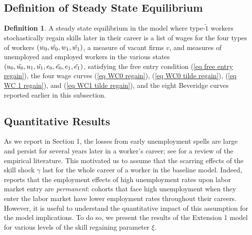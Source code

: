 \documentclass[12pt]{article} %
\theoremstyle{definition}
\newtheorem{definition}{Definition}%
\begin{document}
\medskip


\subsection*{Definition of Steady State Equilibrium}\label{section definition of equil} 


\begin{definition}\label{definition equilibrium regain skill}
A steady state equilibrium in the model where type-$\tilde{1}$ workers stochastically regain skills later in their career is a list of wages for the four types of workers $(w_0, \Tilde{w_0}, w_1, \Tilde{w_1})$, a measure of vacant firms $v$, and measures of unemployed and employed workers in the various states $(u_0, \Tilde{u_0}, u_1, \Tilde{u_1}, e_0, \Tilde{e_0}, e_1, \Tilde{e_1})$, satisfying the free entry condition (\ref{eq free entry regain}), the four wage curves (\ref{eq WC0 regain}), (\ref{eq WC0 tilde regain}), (\ref{eq WC 1 regain}), and (\ref{eq WC1 tilde regain}), and the eight Beveridge curves reported earlier in this subsection. 
\end{definition} 


\subsection*{Quantitative Results} 

As we report in Section 1, the losses from early unemployment spells are large and persist for several years later in a worker's career; see \cite{wachter2020persistent} for a review of the empirical literature.
This motivated us to assume that the scarring effects of the skill shock $\gamma$ last for the whole career of a worker in the baseline model.
Indeed, \cite{rothstein2023lost} reports that the employment effects of high unemployment rates upon labor market entry are \textit{permanent}: cohorts that face high unemployment when they enter the labor market have lower employment rates throughout their careers.
However, it is useful to understand the quantitative impact of this assumption for the model implications.
To do so, we present the results of the Extension 1 model for various levels of the skill regaining parameter $\xi$.
\end{document}
